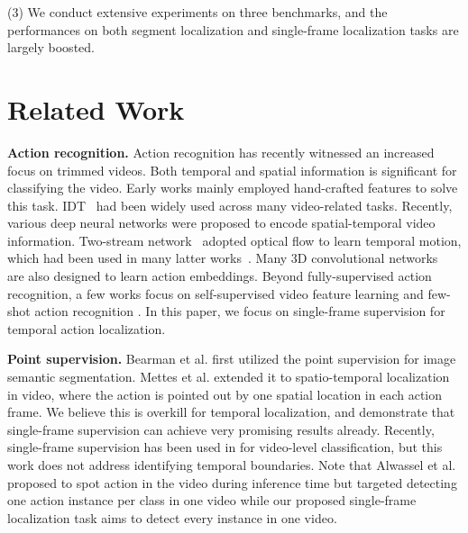 \documentclass[runningheads]{llncs}
\begin{document}
	(3) We conduct extensive experiments on three benchmarks, and the performances on both segment localization and single-frame localization tasks are largely boosted.
	
	\section{Related Work}
	
	
	\textbf{Action recognition.} Action recognition has recently witnessed an increased focus on trimmed videos. Both temporal and spatial information is significant for classifying the video.
	Early works mainly employed hand-crafted features to solve this task. IDT~\cite{WangIDT} had been widely used across many video-related tasks. 
	Recently, various deep neural networks were proposed to encode spatial-temporal video information. 
	Two-stream network~\cite{simonyan2014two} adopted optical flow to learn temporal motion, which had been used in many latter works~\cite{CarreiraI3D,simonyan2014two,TSN2016ECCV}. 
	Many 3D convolutional networks~\cite{CarreiraI3D,Tran_2015_ICCV,Feichtenhofer_2019_ICCV} are also designed to learn action embeddings. Beyond fully-supervised action recognition, a few works focus on self-supervised video feature learning \cite{zhu2020actbert} and few-shot action recognition \cite{zhu2020lim}. In this paper, we focus on single-frame supervision for temporal action localization.
	
	\noindent\textbf{Point supervision.} Bearman et al. \cite{bearman2016s} first utilized the point supervision for image semantic segmentation. Mettes et al. \cite{mettes2016spot} extended it to spatio-temporal localization in video, where the action is pointed out by one spatial location in each action frame.
	We believe this is overkill for temporal localization, and demonstrate that single-frame supervision can achieve very promising results already. Recently, single-frame supervision has been used in \cite{moltisanti2019action} for video-level classification, but this work does not address identifying temporal boundaries.
	Note that Alwassel et al. \cite{alwassel2018action} proposed to spot action in the video during inference time but targeted detecting one action instance per class in one video while our proposed single-frame localization task aims to detect every instance in one video.
	
\end{document}
